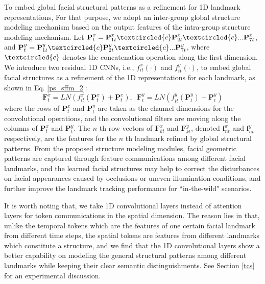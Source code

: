 \documentclass[review]{elsarticle}
\begin{document}
To embed global facial structural patterns as a refinement for 1D landmark representations,
For that purpose, we adopt an inter-group global structure modeling mechanism based on the output features of the intra-group structure modeling mechanism. Let $\textbf{P}^{x}_{t}=\textbf{P}^{x}_{1t} \textcircled{c}\textbf{P}^{x}_{2t}\textcircled{c}...\textbf{P}^{x}_{7t}$, and $\textbf{P}^{y}_{t}=\textbf{P}^{y}_{1t} \textcircled{c}\textbf{P}^{y}_{2t}\textcircled{c}...\textbf{P}^{y}_{7t}$, where $\textcircled{c}$ denotes the concatenation operation along the first dimension. We introduce two residual 1D CNNs, i.e., $f^{x}_{it}(\cdot)$ and $f^{y}_{it}(\cdot)$, to embed global facial structures as a refinement of the 1D representations for each landmark, as shown in Eq. \eqref{ps_sffm_2}:
\begin{equation}
	\label{ps_sffm_2}
	\textbf{F}^{x}_{t} = LN(f^{x}_{it}(\textbf{P}^{x}_{t})+\textbf{P}^{x}_{t}),\,\,\,\textbf{F}^{y}_{t} = LN(f^{y}_{it}(\textbf{P}^{y}_{t})+\textbf{P}^{y}_{t})
\end{equation}
where the rows of $\textbf{P}^{x}_{t}$ and $\textbf{P}^{y}_{t}$ are taken as the channel dimensions for the convolutional operations, and the convolutional filters are moving along the columns of $\textbf{P}^{x}_{t}$ and $\textbf{P}^{y}_{t}$.  The $n$ th row vectors of $\textbf{F}^{x}_{kt}$ and $\textbf{F}^{y}_{kt}$, denoted $\textbf{f}^{x}_{nt}$ and $\textbf{f}^{y}_{nt}$ respectively, are the features for the $n$ th landmark refined by global structural patterns. From the proposed structure modeling modules, facial geometric patterns are captured through feature communications among different facial landmarks, and the learned facial structures may help to correct the disturbances on facial appearances caused by occlusions or uneven illumination conditions, and further improve the landmark tracking performance for ``in-the-wild" scenarios.

It is worth noting that, we take 1D convolutional layers instead of attention layers for token communications in the spatial dimension. The reason lies in that, unlike the temporal tokens which are the features of one certain facial landmark from different time steps, the spatial tokens are features from different landmarks which constitute a structure,  and we find that the 1D convolutional layers show a better capability on modeling the general structural patterns among different landmarks while keeping their clear semantic distinguishments. See Section \ref{tcs} for an experimental discussion.
\end{document}
